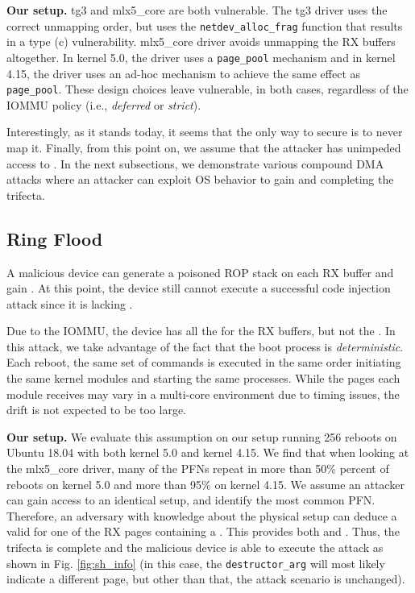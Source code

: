 \smallskip
\noindent\textbf{Our setup.} tg3 and mlx5\_core are both vulnerable. The tg3 driver uses the correct unmapping order, but uses the \texttt{netdev\_alloc\_frag} function that results in a type (c) \subpage{} vulnerability. mlx5\_core driver avoids unmapping the RX buffers altogether. In kernel 5.0, the driver uses a \texttt{page\_pool} mechanism\cite{page_pool} and in kernel 4.15, the driver uses an ad-hoc mechanism to achieve the same effect as \texttt{page\_pool}. These design choices leave \shinfo{} vulnerable, in both cases, regardless of the IOMMU policy (i.e., \emph{deferred} or \emph{strict}). 


Interestingly, as it stands today, it seems that the only way to secure \shinfo{} is to never map it. Finally, from this point on, we assume that the attacker has unimpeded access to \oportunity{}. In the next subsections, we demonstrate various compound DMA attacks where an attacker can exploit OS behavior  to gain \means{} and \motivation{} completing the trifecta.

\subsection{Ring Flood}\label{sec:ringflod}

A malicious device can generate a poisoned ROP stack on each RX buffer and gain \motivation{}. At this point, the device still cannot execute a successful code injection attack since it is lacking \means{}. 

Due to the IOMMU, the device has all the \iova{} for the RX buffers, but not the \kva{}. In this attack, we take advantage of the fact that the boot process is \emph{deterministic}. Each reboot, the same set of commands is executed in the same order initiating the same kernel modules and starting the same processes. While the pages each module receives may vary in a multi-core environment due to timing issues, the drift is not expected to be too large. 

\smallskip
\noindent\textbf{Our setup.} We evaluate this assumption on our setup running 256 reboots on Ubuntu 18.04 with both kernel 5.0 and kernel 4.15.
We find that when looking at the mlx5\_core driver, many of the PFNs repeat in more than 50\% percent of reboots on kernel 5.0 and more than 95\% on kernel 4.15. We assume an attacker can gain access to an identical setup, and identify the most common PFN. Therefore, an adversary with knowledge about the physical setup can deduce a valid \kva{} for one of the RX pages containing a \mabaf. This provides both \means{} and \motivation{}. Thus, the trifecta is complete and the malicious device is able to execute the attack as shown in Fig. \ref{fig:sh_info} (in this case, the \texttt{destructor\_arg} will most likely indicate a different page, but other than that, the attack scenario is unchanged).



